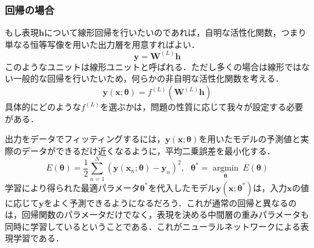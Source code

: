 \documentclass[a4paper,11pt]{jsreport}
\begin{document}
\subsubsection*{回帰の場合}
もし表現$\bm{h}$について線形回帰を行いたいのであれば，自明な活性化関数，つまり単なる恒等写像を用いた出力層を用意すればよい．
\begin{equation}
  \bm{y}
  = \bm{W}^{(L)} \bm{h}
\end{equation}
このようなユニットは線形ユニットと呼ばれる．ただし多くの場合は線形ではない一般的な回帰を行いたいため，何らかの非自明な活性化関数を考える．
\begin{equation}
  \bm{y}(\bm{x}; \bm{\theta})
  = f^{(L)}\left( \bm{W}^{(L)} \bm{h} \right)
\end{equation}
具体的にどのような$f^{(L)}$を選ぶかは，問題の性質に応じて我々が設定する必要がある．\par
出力をデータでフィッティングするには，$\bm{y}(\bm{x}; \bm{\theta})$を用いたモデルの予測値と実際のデータができるだけ近くなるように，平均二乗誤差を最小化する．
\begin{equation}
  E(\bm{\theta})
  = \frac{1}{2} \sum_{n=1}^N \left( \bm{y}(\bm{x}_n; \bm{\theta}) - \bm{y}_n \right)^2, \ \ \
  \bm{\theta}^* = \underset{\bm{\theta}} {\operatorname{argmin}} \ E(\bm{\theta})
\end{equation}
学習により得られた最適パラメータ$\bm{\theta}^*$を代入したモデル$\bm{y}(\bm{x}; \bm{\theta}^*)$は，入力$\bm{x}$の値に応じて$\bm{y}$をよく予測できるようになるだろう．これが通常の回帰と異なるのは，回帰関数のパラメータだけでなく，表現を決める中間層の重みパラメータも同時に学習しているということである．これがニューラルネットワークによる表現学習である．
\end{document}
